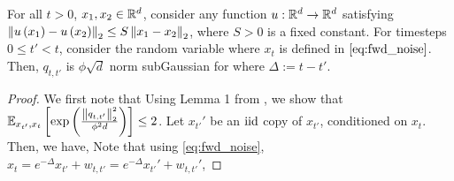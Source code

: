 \begin{lemma}\label{lemma:smootH^{f}n_subgauss}
    For all $t > 0$, $x_{1}, x_{2} \in \mathbb{R}^{d}$, consider any function $u : \mathbb{R}^{d} \rightarrow \mathbb{R}^d$ satisfying $\left\lVert u\left(x_{1}\right) - u\left(x_{2}\right)\right\rVert_{2} \leq S\left\lVert x_{1}-x_{2}\right\rVert_{2}$, where $S > 0$ is a fixed constant. For timesteps $0 \leq t' < t$, consider the random variable 
    where $x_{t}$ is defined in $\eqref{eq:fwd_noise}$. Then, $q_{t,t'}$ is $\phi\sqrt{d}$ norm subGaussian for 
    where $\Delta := t-t'$.
\end{lemma}
\begin{proof}
    We first note that 
    Using Lemma 1 from \cite{jin2019short}, we show that $\mathbb{E}_{x_{t'},x_{t}}\left[\exp\left(\frac{\left\lVert q_{t,t'}\right\rVert_{2}^{2}}{\phi^{2}d}\right)\right] \leq 2$. Let $x_{t'}'$ be an $\textup{iid}$ copy of $x_{t'}$, conditioned on $x_{t}$. Then, we have,
    Note that using \eqref{eq:fwd_noise}, $x_{t} = e^{-\Delta}x_{t'} + w_{t,t'} = e^{-\Delta}x_{t'}' + w_{t,t'}'$,

\end{proof}
